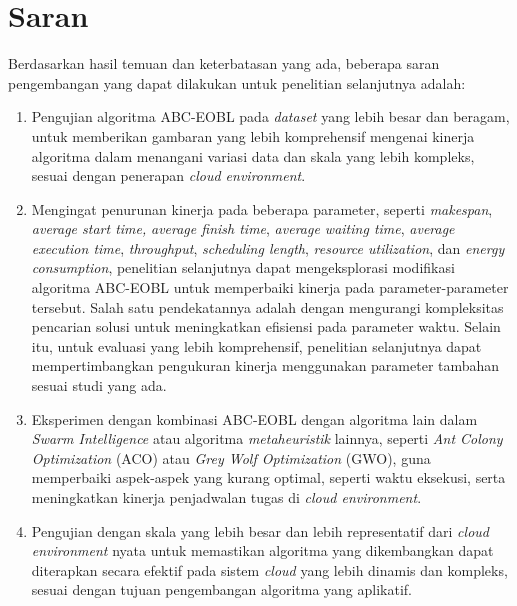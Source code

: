 \section{Saran}
Berdasarkan hasil temuan dan keterbatasan yang ada, beberapa saran pengembangan yang dapat dilakukan untuk penelitian selanjutnya adalah:
\begin{enumerate} [nolistsep]
\item Pengujian algoritma ABC-EOBL pada \textit{dataset} yang lebih besar dan beragam, untuk memberikan gambaran yang lebih komprehensif mengenai kinerja algoritma dalam menangani variasi data dan skala yang lebih kompleks, sesuai dengan penerapan \textit{cloud environment}.
\item Mengingat penurunan kinerja pada beberapa parameter, seperti \textit{makespan}, \textit{average start time,} \textit{average finish time}, \textit{average waiting time}, \textit{average execution time}, \textit{throughput}, \textit{scheduling length}, \textit{resource utilization}, dan \textit{energy consumption}, penelitian selanjutnya dapat mengeksplorasi modifikasi algoritma ABC-EOBL untuk memperbaiki kinerja pada parameter-parameter tersebut. Salah satu pendekatannya adalah dengan mengurangi kompleksitas pencarian solusi untuk meningkatkan efisiensi pada parameter waktu. Selain itu, untuk evaluasi yang lebih komprehensif, penelitian selanjutnya dapat mempertimbangkan pengukuran kinerja menggunakan parameter tambahan sesuai studi yang ada.
\item Eksperimen dengan kombinasi ABC-EOBL dengan algoritma lain dalam \textit{Swarm Intelligence} atau algoritma \textit{metaheuristik} lainnya, seperti \textit{Ant Colony Optimization} (ACO) atau \textit{Grey Wolf Optimization} (GWO), guna memperbaiki aspek-aspek yang kurang optimal, seperti waktu eksekusi, serta meningkatkan kinerja penjadwalan tugas di \textit{cloud environment}.
\item Pengujian dengan skala yang lebih besar dan lebih representatif dari \textit{cloud environment} nyata untuk memastikan algoritma yang dikembangkan dapat diterapkan secara efektif pada sistem \textit{cloud} yang lebih dinamis dan kompleks, sesuai dengan tujuan pengembangan algoritma yang aplikatif.
\end{enumerate}